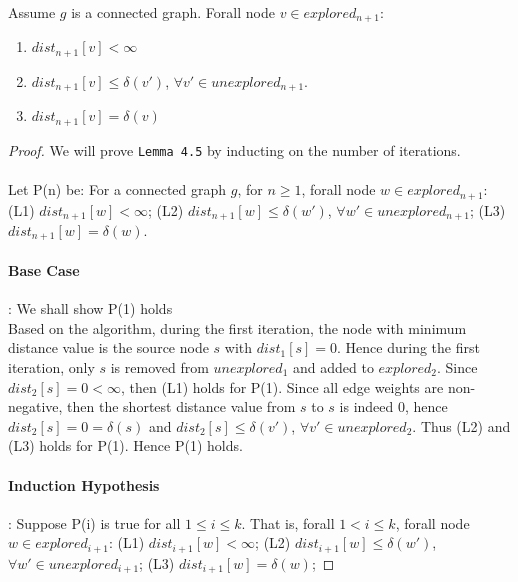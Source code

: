 \begin{sublemma}\label{lemma4.5}
Assume $g$ is a connected graph. Forall node $v \in explored_{n+1}$:
\begin{enumerate}
  \item $dist_{n+1}[v] < \infty$
  \item $dist_{n+1}[v]  \leq \delta(v')$, $\forall v' \in unexplored_{n+1}$.
  \item $dist_{n+1}[v] = \delta(v)$
\end{enumerate}
\end{sublemma}

\begin{proof}
We will prove \texttt{Lemma 4.5} by inducting on the number of iterations. 
\\\\
Let P(n) be: For a connected graph $g$, for $n \geq 1$, forall node $w \in explored_{n+1}$: (L1) $dist_{n+1}[w] < \infty$; (L2) $dist_{n+1}[w] \leq \delta(w')$, $\forall w' \in unexplored_{n+1}$; (L3) $dist_{n+1}[w] = \delta(w)$. 

\paragraph*{Base Case}: We shall show P(1) holds \\
Based on the algorithm, during the first iteration, the node with minimum distance value is the source node $s$ with $dist_1[s] = 0$. Hence during the first iteration, only $s$ is removed from $unexplored_1$ and added to $explored_2$. Since $dist_2[s] = 0 < \infty$, then (L1) holds for P(1). Since all edge weights are non-negative, then the shortest distance value from $s$ to $s$ is indeed $0$, hence $dist_2[s] = 0 = \delta(s)$ and $dist_2[s] \leq \delta(v')$, $\forall v' \in unexplored_2$. Thus (L2) and (L3) holds for P(1). Hence P(1) holds.

\paragraph*{Induction Hypothesis}: Suppose P(i) is true for all $1 \leq i \leq k$. That is, forall $1 < i \leq k$, forall node $w \in explored_{i+1}$: (L1) $dist_{i+1}[w] < \infty$; (L2) $dist_{i+1}[w] \leq \delta(w')$, $\forall w' \in unexplored_{i+1}$; (L3) $dist_{i+1}[w] = \delta(w)$; 


\end{proof}
